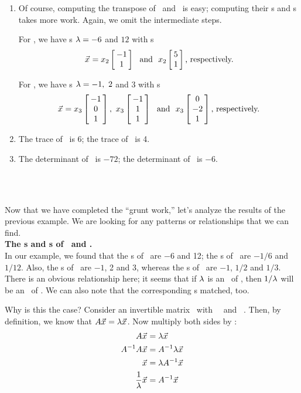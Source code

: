 {\begin{enumerate}
	\item		Of course, computing the transpose of \tta\ and \ttb\ is easy; computing their \el s and \ev s takes more work. Again, we omit the intermediate steps.
	
	For \ttat, we have \el s $\lda = -6$ and $12$ with \ev s $$\vx = x_2 \bmx{c} -1\\1\emx\ \text{ and }\  x_2 \bmx{c} 5\\1\emx \text{, respectively.}$$
	
	For \ttbt, we have \el s $\lda = -1,\ 2$ and $3$ with \ev s $$\vx = x_3 \bmx{c} -1\\0\\1\emx,\ x_3 \bmx{c} -1\\1\\1\emx\ \text{ and }\ x_3\bmx{c} 0\\-2\\1\emx\text{, respectively.}$$
	
	\item		The trace of \tta\ is 6; the trace of \ttb\ is 4.
	
	\item		The determinant of \tta\ is $-72$; the determinant of \ttb\ is $-6$.
	
\end{enumerate}
\ } \\ %

Now that we have completed the ``grunt work,'' let's analyze the results of the previous example. We are looking for any patterns or relationships that we can find.\\

\noindent \textsf{\textbf{The \el s and \ev s of \tta\ and \ttai.}} \\

In our example, we found that the \el s of \tta\ are $-6$ and 12; the \el s of \ttai\ are $-1/6$ and $1/12$. Also, the \el s of \ttb\ are $-1$, 2 and 3, whereas the \el s of \ttbi\ are $-1$, $1/2$ and $1/3$. There is an obvious relationship here; it seems that if $\lda$ is an \el\ of \tta, then $1/\lda$ will be an \el\ of \ttai. We can also note that the corresponding \ev s matched, too.

Why is this the case? Consider an invertible matrix \tta\ with \el\ \lda\ and \ev\ \vx. Then, by definition, we know that $\tta\vx = \lda\vx$. Now multiply both sides by \ttai:
\begin{align*}
\tta\vx & = \lda\vx \\
\ttai\tta\vx & = \ttai\lda\vx \\
\vx & = \lda\ttai\vx \\
\frac{1}{\lda}\vx & = \ttai\vx 
\end{align*}

